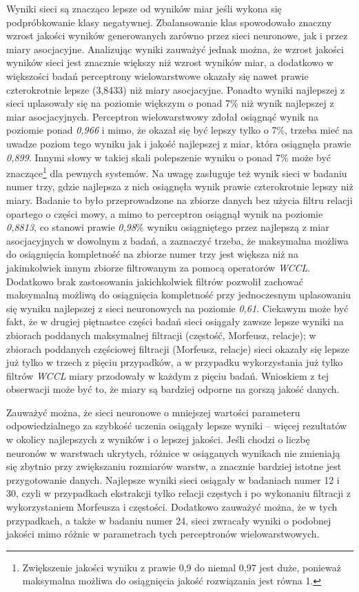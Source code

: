 \documentclass[11pt,a4paper]{llncs}
\begin{document}
\par
Wyniki sieci są znacząco lepsze od wyników miar jeśli wykona się podpróbkowanie klasy negatywnej. 
Zbalansowanie klas spowodowało znaczny wzrost jakości wyników generowanych zarówno przez sieci neuronowe, jak i przez miary asocjacyjne.
Analizując wyniki zauważyć jednak można, że wzrost jakości wyników sieci jest znacznie większy niż wzrost wyników miar, a dodatkowo w większości badań perceptrony wielowarstwowe okazały się nawet prawie czterokrotnie lepsze (3,8433) niż miary asocjacyjne.
Ponadto wyniki najlepszej z sieci uplasowały się na poziomie większym o ponad 7\% niż wynik najlepszej z miar asocjacyjnych. 
Perceptron wielowarstwowy zdołał osiągnąć wynik na poziomie ponad \emph{0,966} i mimo, że okazał się być lepszy tylko o 7\%, trzeba mieć na uwadze poziom tego wyniku jak i jakość najlepszej z miar, która osiągnęła prawie \emph{0,899}.
Innymi słowy w takiej skali polepszenie wyniku o ponad 7\% może być znaczące\footnote{Zwiększenie jakości wyniku z prawie 0,9 do niemal 0,97 jest duże, ponieważ maksymalna możliwa do osiągnięcia jakość rozwiązania jest równa 1.} dla pewnych systemów.
Na uwagę zasługuje też wynik sieci w badaniu numer trzy, gdzie najlepsza z nich osiągnęła wynik prawie czterokrotnie lepszy niż miary.
Badanie to było przeprowadzone na zbiorze danych bez użycia filtru relacji opartego o części mowy, a mimo to perceptron osiągnął wynik na poziomie \emph{0,8813}, co stanowi prawie \emph{0,98}\% wyniku osiągniętego przez najlepszą z miar asocjacyjnych w dowolnym z badań, a zaznaczyć trzeba, że maksymalna możliwa do osiągnięcia kompletność na zbiorze numer trzy jest większa niż na jakimkolwiek innym zbiorze filtrowanym za pomocą operatorów \emph{WCCL}.
Dodatkowo brak zastosowania jakichkolwiek filtrów pozwolił zachować maksymalną możliwą do osiągnięcia kompletność przy jednoczesnym uplasowaniu się wyniku najlepszej z sieci neuronowych na poziomie \emph{0,61}.
Ciekawym może być fakt, że w drugiej piętnastce części badań sieci osiągały zawsze lepsze wyniki na zbiorach poddanych maksymalnej filtracji (częstość, Morfeusz, relacje); w zbiorach poddanych częściowej filtracji (Morfeusz, relacje) sieci okazały się lepsze już tylko w trzech z pięciu przypadków, a w przypadku wykorzystania już tylko filtrów \emph{WCCL} miary przodowały w każdym z pięciu badań.
Wnioskiem z tej obserwacji może być to, że miary są bardziej odporne na gorszą jakość danych.

\par
Zauważyć można, że sieci neuronowe o mniejszej wartości parameteru odpowiedzialnego za szybkość uczenia osiągały lepsze wyniki -- więcej rezultatów w okolicy najlepszych z wyników i o lepszej jakości.
Jeśli chodzi o liczbę neuronów w warstwach ukrytych, różnice w osiąganych wynikach nie zmieniają się zbytnio przy zwiększaniu rozmiarów warstw, a znacznie bardziej istotne jest przygotowanie danych.
Najlepsze wyniki sieci osiągały w badaniach numer 12 i 30, czyli w przypadkach ekstrakcji tylko relacji częstych i po wykonaniu filtracji z wykorzystaniem Morfeusza i częstości.
Dodatkowo zauważyć można, że w tych przypadkach, a także w badaniu numer 24, sieci zwracały wyniki o podobnej jakości mimo różnic w parametrach tych perceptronów wielowarstwowych.
\end{document}
